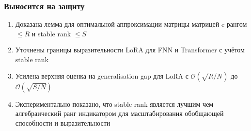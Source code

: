 \documentclass[10pt]{beamer}
\begin{document}
\begin{frame}
    \frametitle{Выносится на защиту}
    \begin{enumerate}
        \item Доказана лемма для оптимальной аппроксимации матрицы матрицей c рангом $\leqslant R$ и stable rank $\leqslant S$
        \item Уточнены границы выразительности LoRA для FNN и Transformer с учётом stable rank
        \item Усилена верхняя оценка на generalisation gap для LoRA с $\mathcal{O}(\sqrt{R/N})$ до $\mathcal{O}(\sqrt{S/N})$
        \item Экспериментально показано, что stable rank является лучшим чем алгебраический ранг индикатором для масштабирования обобщающей способности и выразительности
    \end{enumerate}
\end{frame}
\end{document}
